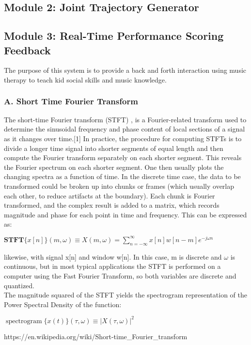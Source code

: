 \subsection{Module 2: Joint Trajectory Generator}



\subsection{Module 3: Real-Time Performance Scoring Feedback}
The purpose of this system is to provide a back and forth interaction using music 
therapy to teach kid social skills and music knowledge.

\subsubsection{A. Short Time Fourier Transform}
The short-time Fourier transform (STFT) , is a Fourier-related 
transform used to determine the sinusoidal frequency and phase content of local 
sections of a signal as it changes over time.[1] In practice, the procedure for 
computing STFTs is to divide a longer time signal into shorter segments of equal 
length and then compute the Fourier transform separately on each shorter segment. 
This reveals the Fourier spectrum on each shorter segment. One then usually plots 
the changing spectra as a function of time.
In the discrete time case, the data to be transformed could be broken up into chunks 
or frames (which usually overlap each other, to reduce artifacts at the boundary). 
Each chunk is Fourier transformed, and the complex result is added to a matrix, which 
records magnitude and phase for each point in time and frequency. This can be expressed as:

${\displaystyle \mathbf {STFT} \{x[n]\}(m,\omega )\equiv X(m,\omega )=\sum _{n=-\infty }^{\infty }x[n]w[n-m]e^{-j\omega n}}$

likewise, with signal x[n] and window w[n]. In this case, m is discrete and $\omega$ 
is continuous, but in most typical applications the STFT is performed on a computer 
using the Fast Fourier Transform, so both variables are discrete and quantized.\\
The magnitude squared of the STFT yields the spectrogram representation of the Power Spectral Density of the function:

${\displaystyle \operatorname {spectrogram} \{x(t)\}(\tau ,\omega )\equiv |X(\tau ,\omega )|^{2}}$
 

https://en.wikipedia.org/wiki/Short-time_Fourier_transform

